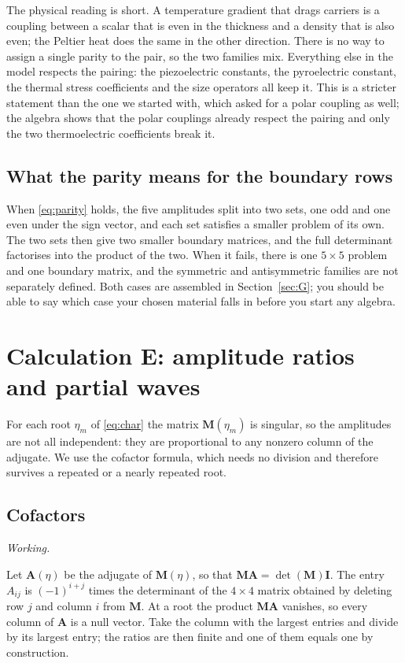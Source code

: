 \documentclass[11pt,a4paper]{article}
\newif\ifshowworked \showworkedtrue
\newenvironment{worked}{\ifshowworked\par\smallskip\noindent\textit{Working.}\par\else\setbox0\vbox\bgroup\fi}{\ifshowworked\par\smallskip\else\egroup\fi}
\begin{document}
The physical reading is short. A temperature gradient that drags carriers is a coupling between a scalar
that is even in the thickness and a density that is also even; the Peltier heat does the same in the other
direction. There is no way to assign a single parity to the pair, so the two families mix. Everything else
in the model respects the pairing: the piezoelectric constants, the pyroelectric constant, the thermal
stress coefficients and the size operators all keep it. This is a stricter statement than the one we
started with, which asked for a polar coupling as well; the algebra shows that the polar couplings already
respect the pairing and only the two thermoelectric coefficients break it.

\subsection{What the parity means for the boundary rows}

When \eqref{eq:parity} holds, the five amplitudes split into two sets, one odd and one even under the sign
vector, and each set satisfies a smaller problem of its own. The two sets then give two smaller boundary
matrices, and the full determinant factorises into the product of the two. When it fails, there is one
$5\times5$ problem and one boundary matrix, and the symmetric and antisymmetric families are not separately
defined. Both cases are assembled in Section~\ref{sec:G}; you should be able to say which case your chosen
material falls in before you start any algebra.

\section{Calculation E: amplitude ratios and partial waves}\label{sec:E}

For each root $\eta_m$ of \eqref{eq:char} the matrix $\mathbf M(\eta_m)$ is singular, so the amplitudes are
not all independent: they are proportional to any nonzero column of the adjugate. We use the cofactor
formula, which needs no division and therefore survives a repeated or a nearly repeated root.

\subsection{Cofactors}

\begin{worked}
Let $\mathbf A(\eta)$ be the adjugate of $\mathbf M(\eta)$, so that $\mathbf M\mathbf A=\det(\mathbf M)\mathbf I$.
The entry $A_{ij}$ is $(-1)^{i+j}$ times the determinant of the $4\times4$ matrix obtained by deleting row
$j$ and column $i$ from $\mathbf M$. At a root the product $\mathbf M\mathbf A$ vanishes, so every column of
$\mathbf A$ is a null vector. Take the column with the largest entries and divide by its largest entry; the
ratios are then finite and one of them equals one by construction.
\end{worked}
\end{document}

